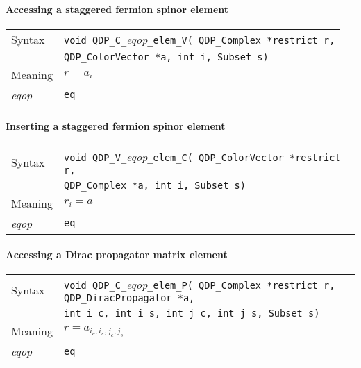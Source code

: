 \documentclass{article}
\newcommand{\tComplex}{QDP\ttdash Complex }
\newcommand{\tColorVector}{QDP\ttdash ColorVector }
\newcommand{\tDiracPropagator}{QDP\ttdash DiracPropagator }
\newcommand{\namespace}{QDP}
\newcommand{\ttdash}{{\tt \_}}
\newcommand{\extraarg}{, Subset s}
\begin{document}
\paragraph{Accessing a staggered fermion spinor element}

\begin{flushleft}
  \begin{tabular}{|l|l|}
  \hline
  Syntax      & {\tt void \namespace}\ttdash{\tt C}\ttdash{\it eqop}\ttdash{\tt elem}\ttdash{\tt V( \tComplex *restrict r,}\\
              & {\tt \tColorVector *a, int i\extraarg)} \\
  \hline
  Meaning     & $r = a_i$\\
  \hline
  {\it eqop}  & {\tt eq} \\
  \hline
  \end{tabular}
\end{flushleft}

\paragraph{Inserting a staggered fermion spinor element}

\begin{flushleft}
  \begin{tabular}{|l|l|}
  \hline
  Syntax      & {\tt void \namespace}\ttdash{\tt V}\ttdash{\it eqop}\ttdash{\tt elem}\ttdash{\tt C( \tColorVector *restrict r,}\\
              & {\tt \tComplex *a, int i\extraarg)} \\
  \hline
  Meaning     & $r_i = a$\\
  \hline
  {\it eqop}  & {\tt eq} \\
  \hline
  \end{tabular}
\end{flushleft}

\paragraph{Accessing a Dirac propagator matrix element}

\begin{flushleft}
  \begin{tabular}{|l|l|}
  \hline
  Syntax      & {\tt void \namespace}\ttdash{\tt C}\ttdash{\it eqop}\ttdash{\tt elem}\ttdash{\tt P( \tComplex *restrict r, \tDiracPropagator *a,} \\
              & {\tt int i\_c, int i\_s, int j\_c, int j\_s\extraarg)} \\
  \hline
  Meaning     & $r = a_{i_c,i_s,j_c,j_s}$\\
  \hline
  {\it eqop}  & {\tt eq} \\
  \hline
  \end{tabular}
\end{flushleft}
\end{document}
